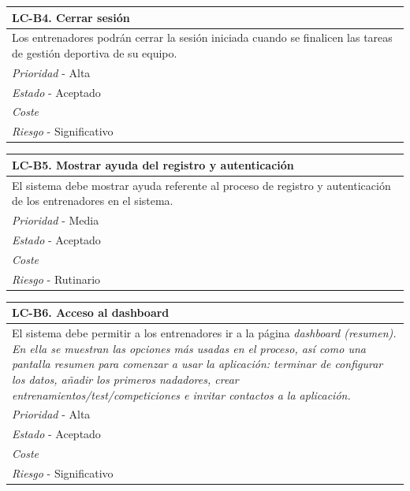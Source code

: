 	\begin{center}
		\begin{tabularx}{15cm}{|X|}
			\hline 
				\bf{LC-B4. Cerrar sesión}\\
			\hline
				Los entrenadores podrán cerrar la sesión iniciada cuando se finalicen las tareas de gestión deportiva de su equipo.\\
			\hline
				{\it Prioridad} - Alta\\
			\hline
				{\it Estado} - Aceptado\\
			\hline
				{\it Coste}\\
			\hline
				{\it Riesgo} - Significativo\\
			\hline
		\end{tabularx}
	\end{center}
	
	\begin{center}
		\begin{tabularx}{15cm}{|X|}
			\hline 
				\bf{LC-B5. Mostrar ayuda del registro y autenticación}\\
			\hline
				El sistema debe mostrar ayuda referente al proceso de registro y autenticación de los entrenadores en el sistema.\\
			\hline
				{\it Prioridad} - Media\\
			\hline
				{\it Estado} - Aceptado\\
			\hline
				{\it Coste}\\
			\hline
				{\it Riesgo} - Rutinario\\
			\hline
		\end{tabularx}
	\end{center}
	
	\begin{center}
		\begin{tabularx}{15cm}{|X|}
			\hline 
				\bf{LC-B6. Acceso al dashboard}\\
			\hline
				El sistema debe permitir a los entrenadores ir a la página \it{dashboard} (resumen). En ella se muestran las opciones más usadas en el proceso, así como una pantalla resumen para comenzar a usar la aplicación: terminar de configurar los datos, añadir los primeros nadadores, crear entrenamientos/test/competiciones e invitar contactos a la aplicación.\\
			\hline
				{\it Prioridad} - Alta\\
			\hline
				{\it Estado} - Aceptado\\
			\hline
				{\it Coste}\\
			\hline
				{\it Riesgo} - Significativo\\
			\hline
		\end{tabularx}
	\end{center}
	
